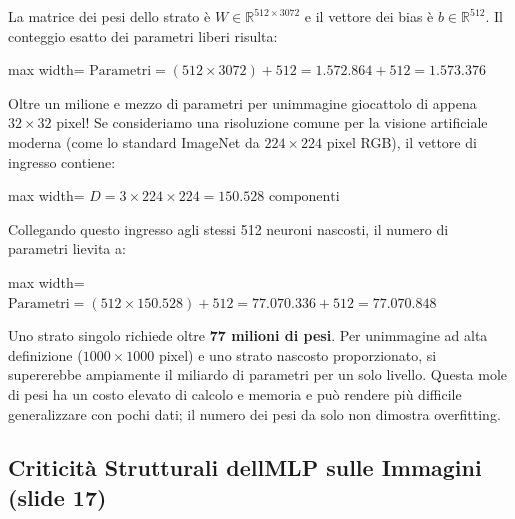 \documentclass[11pt,a4paper,oneside,openany]{book}
\begin{document}
La matrice dei pesi dello strato è \(W \in \mathbb{R}^{512 \times 3072}\) e il vettore dei bias è \(b \in \mathbb{R}^{512}\). Il conteggio esatto dei parametri liberi risulta:

\begin{center}
\begin{adjustbox}{max width=\linewidth}
$\displaystyle 
\text{Parametri} = (512 \times 3072) + 512 = 1.572.864 + 512 = \mathbf{1.573.376}
$
\end{adjustbox}
\end{center}

Oltre un milione e mezzo di parametri per un\textquotesingle immagine giocattolo di appena \(32 \times 32\) pixel! Se consideriamo una risoluzione comune per la visione artificiale moderna (come lo standard ImageNet da \(224 \times 224\) pixel RGB), il vettore di ingresso contiene:

\begin{center}
\begin{adjustbox}{max width=\linewidth}
$\displaystyle 
D = 3 \times 224 \times 224 = 150.528 \text{ componenti}
$
\end{adjustbox}
\end{center}

Collegando questo ingresso agli stessi 512 neuroni nascosti, il numero di parametri lievita a:

\begin{center}
\begin{adjustbox}{max width=\linewidth}
$\displaystyle 
\text{Parametri} = (512 \times 150.528) + 512 = 77.070.336 + 512 = \mathbf{77.070.848}
$
\end{adjustbox}
\end{center}

Uno strato singolo richiede oltre \textbf{77 milioni di pesi}. Per un\textquotesingle immagine ad alta definizione (\(1000 \times 1000\) pixel) e uno strato nascosto proporzionato, si supererebbe ampiamente il miliardo di parametri per un solo livello. Questa mole di pesi ha un costo elevato di calcolo e memoria e può rendere più difficile generalizzare con pochi dati; il numero dei pesi da solo non dimostra overfitting.

\subsection{Criticità Strutturali dell\textquotesingle MLP sulle Immagini (slide 17)}\label{f02-r207}
\end{document}
